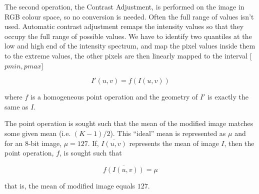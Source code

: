\documentclass[journal,transmag]{IEEEtran}
\begin{document}
The second operation, the Contrast Adjustment, is performed on the image in RGB colour space, so no conversion is needed. Often the full range of values isn't used. Automatic contrast adjustment remaps the intensity values so that they occupy the full range of possible values\cite{automaticContrast}. We have to identify two quantiles at the low and high end of the intensity spectrum, and map the pixel values inside them to the extreme values, the other pixels are then linearly mapped to the interval [$pmin, pmax$]

\begin{equation}
	I'(u, v) = f(I(u, v))	
\end{equation}

\noindent where $f$ is a homogeneous point operation and the geometry of $I'$ is exactly the same as $I$.

The point operation is sought such that the mean of the modified image matches some given mean (i.e. $(K-1)/2$).  This ``ideal'' mean is represented as $\mu$ and for an $8$-bit image, $\mu = 127$.  If, $\overline{I(u, v)}$ represents the mean of image $I$, then the point operation, $f$, is sought such that

\begin{equation}
	\overline{f(I(u, v))} = \mu
\end{equation}

\noindent that is, the mean of modified image equals $127$.
\end{document}

